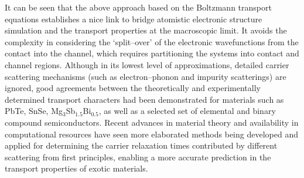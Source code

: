 It can be seen that the above approach based on the Boltzmann transport equations establishes a nice link to bridge atomistic electronic structure simulation and the transport properties at the macroscopic limit. It avoids the complexity in considering the `split--over' of the electronic wavefunctions from the contact into the channel, which requires partitioning the systems into contact and channel regions.\cite{datta2005quantum} Although in its lowest level of approximations, detailed carrier scattering mechanisms (such as electron--phonon and impurity scatterings) are ignored, good agreements between the theoretically and experimentally determined transport characters had been demonstrated for materials such as  PbTe,\cite{singh2010doping} SnSe,\cite{zhao2016ultrahigh} Mg$_3$Sb$_{1.5}$Bi$_{0.5}$,\cite{zhang2017high} as well as a selected set of elemental and binary compound semiconductors.\cite{ricci2017ab}  Recent advances in material theory and availability in computational resources have seen more elaborated methods being developed and applied for determining the carrier relaxation times contributed by different scattering from first principles, enabling a more accurate prediction in the transport properties of exotic materials.\cite{krishnaswamy2017first,ganose2021efficient,jung2021prediction}

